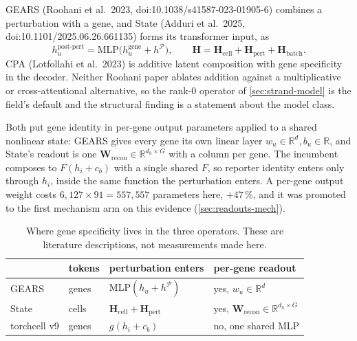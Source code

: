  GEARS (Roohani et al.\ 2023,
doi:10.1038/s41587-023-01905-6) combines a perturbation with a gene, and State (Adduri et
al.\ 2025, doi:10.1101/2025.06.26.661135) forms its transformer input, as
$$h_u^{\mathrm{post\text{-}pert}} = \mathrm{MLP}\big(h_u^{\mathrm{gene}} + h^{\mathcal P}\big),
\qquad
\mathbf H = \mathbf H_{\mathrm{cell}} + \mathbf H_{\mathrm{pert}} + \mathbf H_{\mathrm{batch}} .$$
CPA (Lotfollahi et al.\ 2023) is additive latent composition with gene specificity in the
decoder. Neither Roohani paper ablates addition against a multiplicative or
cross-attentional alternative, so the rank-0 operator of \cref{sec:strand-model} is the
field's default and the structural finding is a statement about the model class.

 Both put gene identity in per-gene output
parameters applied to a shared nonlinear state: GEARS gives every gene its own linear layer
$w_u \in \mathbb R^d, b_u \in \mathbb R$, and State's readout is one
$\mathbf W_{\mathrm{recon}} \in \mathbb R^{d_h \times G}$ with a column per gene. The
incumbent composes to $F(h_i + c_b)$ with a single shared $F$, so reporter identity enters
only through $h_i$, inside the same function the perturbation enters. A per-gene output
weight costs $6{,}127 \times 91 = 557{,}557$ parameters here, $+47\,\%$, and it was
promoted to the first mechanism arm on this evidence (\cref{sec:readouts-mech}).

\begin{table}[htbp]
\centering\footnotesize
\begin{tabular}{llll}
\toprule
 & tokens & perturbation enters & per-gene readout \\
\midrule
GEARS         & genes & $\mathrm{MLP}(h_u + h^{\mathcal P})$ & yes, $w_u\in\mathbb R^{d}$ \\
State         & cells & $\mathbf H_{\mathrm{cell}} + \mathbf H_{\mathrm{pert}}$ & yes, $\mathbf W_{\mathrm{recon}}\in\mathbb R^{d_h\times G}$ \\
torchcell v9  & genes & $g(h_i + c_b)$ & no, one shared MLP \\
\bottomrule
\end{tabular}
\caption[]{Where gene specificity lives in the three operators. These are literature
descriptions, not measurements made here.}
\label{tab:strand-operators}
\end{table}

